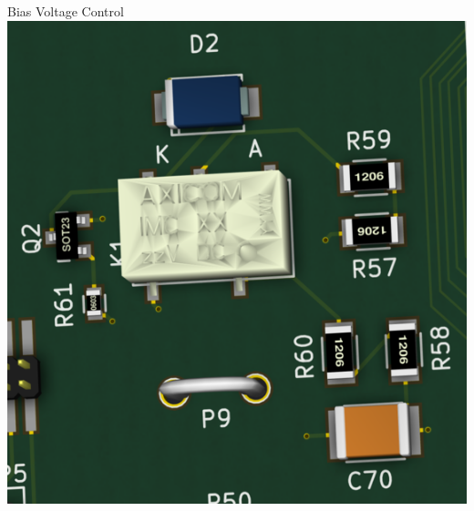 \documentclass{beamer}
\begin{document}
\begin{frame}{Bias Voltage Control}
  \centering
  \includegraphics[height=\textheight]{figures/DAQCard2015_HV_small}
\end{frame}
\end{document}

